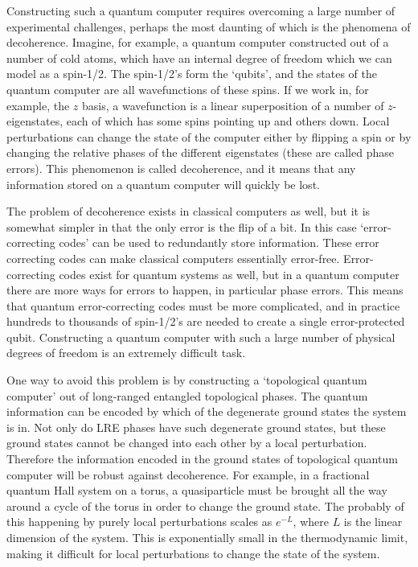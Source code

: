 Constructing such a quantum computer requires overcoming a large number of experimental challenges, perhaps the most daunting of which is the phenomena of decoherence. Imagine, for example, a quantum computer constructed out of a number of cold atoms, which have an internal degree of freedom which we can model as a spin-1/2. The spin-1/2's form the `qubits', and the states of the quantum computer are all wavefunctions of these spins. If we work in, for example, the $z$ basis, a wavefunction is a linear superposition of a number of $z$-eigenstates, each of which has some spins pointing up and others down. Local perturbations can change the state of the computer either by flipping a spin or by changing the relative phases of the different eigenstates (these are called phase errors). This phenomenon is called decoherence, and it means that any information stored on a quantum computer will quickly be lost.

The problem of decoherence exists in classical computers as well, but it is somewhat simpler in that the only error is the flip of a bit. In this case `error-correcting codes' can be used to redundantly store information. These error correcting codes can make classical computers essentially error-free. Error-correcting codes exist for quantum systems as well, but in a quantum computer there are more ways for errors to happen, in particular phase errors. This means that quantum error-correcting codes must be more complicated, and in practice hundreds to thousands of spin-1/2's are needed to create a single error-protected qubit. Constructing a quantum computer with such a large number of physical degrees of freedom is an extremely difficult task.

One way to avoid this problem is by constructing a `topological quantum computer' out of long-ranged entangled topological phases. The quantum information can be encoded by which of the degenerate ground states the system is in. Not only do LRE phases have such degenerate ground states, but these ground states cannot be changed into each other by a local perturbation. Therefore the information encoded in the ground states of topological quantum computer will be robust against decoherence. For example, in a fractional quantum Hall system on a torus, a quasiparticle must be brought all the way around a cycle of the torus in order to change the ground state. The probably of this happening by purely local perturbations scales as $e^{-L}$, where $L$ is the linear dimension of the system. This is exponentially small in the thermodynamic limit, making it difficult for local perturbations to change the state of the system.

